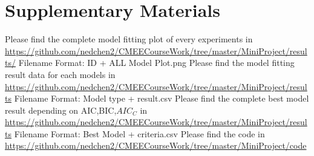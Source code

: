 \documentclass[11pt]{article}
\begin{document}
  \section{Supplementary Materials}
  \linenumbers
  Please find the complete model fitting plot of every experiments in
  \newline
  \href{https://github.com/nedchen2/CMEECourseWork/tree/master/MiniProject/results/}{https://github.com/nedchen2/CMEECourseWork/tree/master/MiniProject/results/}
  Filename Format: ID + ALL Model Plot.png
  \newline
  Please find the model fitting result data for each models in   
  \newline 
  \href{https://github.com/nedchen2/CMEECourseWork/tree/master/MiniProject/results}{https://github.com/nedchen2/CMEECourseWork/tree/master/MiniProject/results}
  Filename Format: Model type + result.csv
  \newline   
  Please find the complete best model result depending on AIC,BIC,$AIC_C$ in 
  \newline
  \href{https://github.com/nedchen2/CMEECourseWork/tree/master/MiniProject/results}{https://github.com/nedchen2/CMEECourseWork/tree/master/MiniProject/results}
  Filename Format: Best Model + criteria.csv
  \newline
  Please find the code in 
  \newline
  \href{https://github.com/nedchen2/CMEECourseWork/tree/master/MiniProject/code}{https://github.com/nedchen2/CMEECourseWork/tree/master/MiniProject/code}
  \newpage
  
  
  
\end{document}
